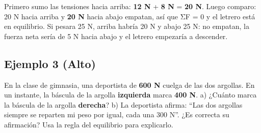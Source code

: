 \documentclass[
  spanish,
  letterpaper,
  12pt,
  oneside,
  open=any,
  DIV=15]{scrbook}
\begin{document}
\begin{tcolorbox}[enhanced jigsaw, arc=.35mm, bottomrule=.15mm, bottomtitle=1mm, breakable, colback=white, colbacktitle=quarto-callout-note-color!10!white, colframe=quarto-callout-note-color-frame, coltitle=black, left=2mm, leftrule=.75mm, opacityback=0, opacitybacktitle=0.6, rightrule=.15mm, title=\textcolor{quarto-callout-note-color}{\faInfo}\hspace{0.5em}{Paso 3: Explicación Detallada}, titlerule=0mm, toprule=.15mm, toptitle=1mm]

Primero sumo las tensiones hacia arriba:
\textcolor[HTML]{7C3AED}{\textbf{12 N}} +
\textcolor[HTML]{7C3AED}{\textbf{8 N}} =
\textcolor[HTML]{7C3AED}{\textbf{20 N}}. Luego comparo: 20 N hacia
arriba y \textcolor[HTML]{2563EB}{\textbf{20 N}} hacia abajo empatan,
así que ΣF = 0 y el letrero está en equilibrio. Si pesara 25 N, arriba
habría 20 N y abajo 25 N: no empatan, la fuerza neta sería de 5 N hacia
abajo y el letrero empezaría a descender.

\end{tcolorbox}

\subsection{Ejemplo 3 (Alto)}\label{ejemplo-3-alto-3}

\begin{tcolorbox}[enhanced jigsaw, arc=.35mm, bottomrule=.15mm, bottomtitle=1mm, breakable, colback=white, colbacktitle=quarto-callout-note-color!10!white, colframe=quarto-callout-note-color-frame, coltitle=black, left=2mm, leftrule=.75mm, opacityback=0, opacitybacktitle=0.6, rightrule=.15mm, title=\textcolor{quarto-callout-note-color}{\faInfo}\hspace{0.5em}{Paso 1: Problema}, titlerule=0mm, toprule=.15mm, toptitle=1mm]

En la clase de gimnasia, una deportista de
\textcolor[HTML]{2563EB}{\textbf{600 N}} cuelga de las dos argollas. En
un instante, la báscula de la argolla
\textcolor[HTML]{7C3AED}{\textbf{izquierda}} marca
\textcolor[HTML]{7C3AED}{\textbf{400 N}}. a) ¿Cuánto marca la báscula de
la argolla \textcolor[HTML]{2563EB}{\textbf{derecha}}? b) La deportista
afirma: ``Las dos argollas siempre se reparten mi peso por igual, cada
una 300 N''. ¿Es correcta su afirmación? Usa la regla del equilibrio
para explicarlo.

\end{tcolorbox}
\end{document}

